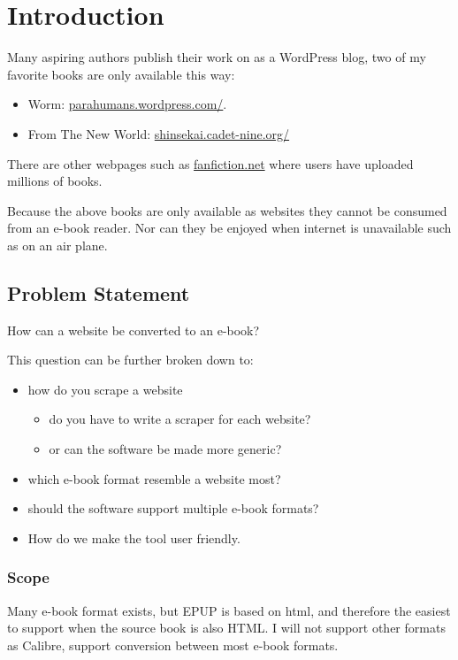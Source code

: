 \documentclass[]{report}   %
\begin{document}
\chapter{Introduction}           
Many aspiring authors publish their work on as a WordPress blog, two
of my favorite books are only available this way:
\begin{itemize}
	\item Worm\cite{worm}: \url{parahumans.wordpress.com/}.
	\item From The New World\cite{from_the_new_world}: \url{shinsekai.cadet-nine.org/} 
\end{itemize}
There are other webpages such as \url{fanfiction.net} where users have uploaded millions of books.

Because the above books are only available as websites they cannot be consumed
from an e-book reader. Nor can they be enjoyed when internet is unavailable such
as on an air plane.

\section{Problem Statement}
How can a website be converted to an e-book?

This question can be further broken down to:
\begin{itemize}
    \item how do you scrape a website
    \begin{itemize}
        \item do you have to write a scraper for each website?
		\item or can the software be made more generic?
    \end{itemize}
    \item which e-book format resemble a website most?
    \item should the software support multiple e-book formats?
    \item How do we make the tool user friendly.
\end{itemize}

\subsection{Scope}
Many e-book format exists, but EPUP is based on html, and therefore the easiest
to support when the source book is also HTML. I will not support other formats
as Calibre\cite{calibre}, support conversion between most
e-book formats.
\end{document}
